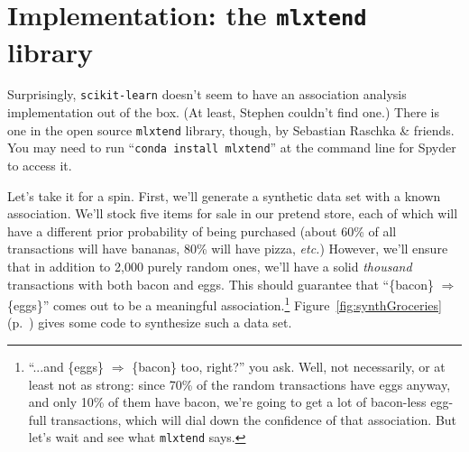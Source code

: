 \vspace{-.1in}

\section{Implementation: the \texttt{mlxtend} library}


Surprisingly, \texttt{scikit-learn} doesn't seem to have an association
analysis implementation out of the box. (At least, Stephen couldn't find one.)
There is one in the open source \texttt{mlxtend} library, though, by Sebastian
Raschka \& friends. You may need to run ``\texttt{conda install mlxtend}'' at
the command line for Spyder to access it.


\smallskip
Let's take it for a spin. First, we'll generate a synthetic data set with a
known association. We'll stock five items for sale in our pretend store, each
of which will have a different prior probability of being purchased (about 60\%
of all transactions will have bananas, 80\% will have pizza, \textit{etc.})
However, we'll ensure that in addition to 2,000 purely random ones, we'll have
a solid \textit{thousand} transactions with both bacon and eggs. This should
guarantee that ``\{bacon\} $\Rightarrow$ \{eggs\}'' comes out to be a
meaningful association.\footnote{``...and \{eggs\} $\Rightarrow$ \{bacon\} too,
right?'' you ask. Well, not necessarily, or at least not as strong: since 70\%
of the random transactions have eggs anyway, and only 10\% of them have bacon,
we're going to get a lot of bacon-less egg-full transactions, which will dial
down the confidence of that association. But let's wait and see what
\texttt{mlxtend} says.} Figure~\ref{fig:synthGroceries}
(p.~\pageref{fig:synthGroceries}) gives some code to synthesize such a data set.

